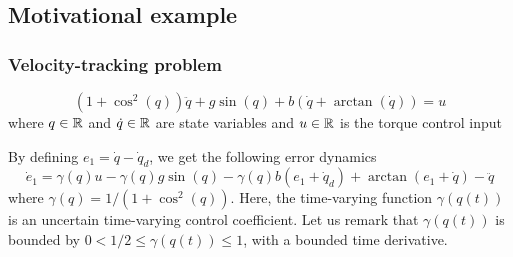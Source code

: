 \subsection{Motivational example}
\subsubsection{Velocity-tracking problem}
    \begin{equation*}
    \left(1 + \cos^2(q)\right)\ddot{q} + g\sin(q) + b\left(\dot{q} + \arctan (\dot{q})\right) = u
    \end{equation*}
    where $q \in \mathbb{R}$ and $\dot{q} \in \mathbb{R}$ are state variables and $u \in \mathbb{R}$ is the torque control input

    By defining $e_1 = \dot{q} - \dot{q}_d$, we get the following error dynamics
    \begin{equation}
        \dot{e}_1 = \gamma(q)u - \gamma(q)g\sin(q) - \gamma(q)b(e_1 + \dot{q}_d) + \arctan(e_1 + \dot{q}) - \ddot{q}
    \end{equation}
    where $\gamma(q) = 1/(1 + \cos^2(q))$. Here, the time-varying function $\gamma(q(t))$ is an uncertain time-varying control coefficient. Let us remark that $\gamma(q(t))$ is bounded by $0 < 1/2 \leq \gamma(q(t)) \leq 1$, with a bounded time derivative.

